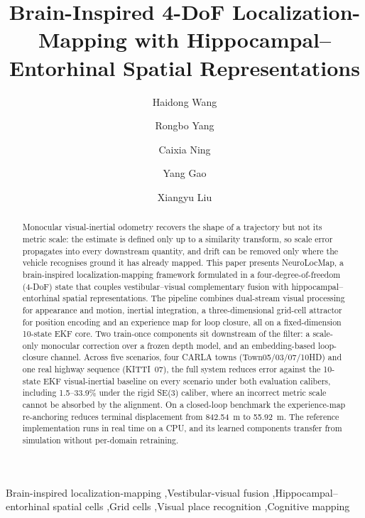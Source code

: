 \documentclass[review,12pt]{elsarticle}
\begin{document}
\begin{frontmatter}

\title{Brain-Inspired 4-DoF Localization-Mapping with Hippocampal--Entorhinal Spatial Representations}

\author[hutb,xjl]{Haidong Wang}
\author[hutb]{Rongbo Yang}
\author[hutb]{Caixia Ning}
\author[hutb]{Yang Gao}
\author[hutb]{Xiangyu Liu}


\begin{abstract}
    \sloppy
    Monocular visual-inertial odometry recovers the shape of a trajectory but not its metric scale: the estimate is defined only up to a similarity transform, so scale error propagates into every downstream quantity, and drift can be removed only where the vehicle recognises ground it has already mapped. This paper presents NeuroLocMap, a brain-inspired localization-mapping framework formulated in a four-degree-of-freedom (4-DoF) state that couples vestibular--visual complementary fusion with hippocampal--entorhinal spatial representations. The pipeline combines dual-stream visual processing for appearance and motion, inertial integration, a three-dimensional grid-cell attractor for position encoding and an experience map for loop closure, all on a fixed-dimension 10-state EKF core. Two train-once components sit downstream of the filter: a scale-only monocular correction over a frozen depth model, and an embedding-based loop-closure channel. Across five scenarios, four CARLA towns (Town05/03/07/10HD) and one real highway sequence (KITTI~07), the full system reduces error against the 10-state EKF visual-inertial baseline on every scenario under both evaluation calibers, including 1.5--33.9\% under the rigid SE(3) caliber, where an incorrect metric scale cannot be absorbed by the alignment. On a closed-loop benchmark the experience-map re-anchoring reduces terminal displacement from 842.54~m to 55.92~m. The reference implementation runs in real time on a CPU, and its learned components transfer from simulation without per-domain retraining.
\end{abstract}

\begin{keyword}
Brain-inspired localization-mapping \sep Vestibular-visual fusion \sep Hippocampal--entorhinal spatial cells \sep Grid cells \sep Visual place recognition \sep Cognitive mapping
\end{keyword}

\end{frontmatter}
\end{document}
